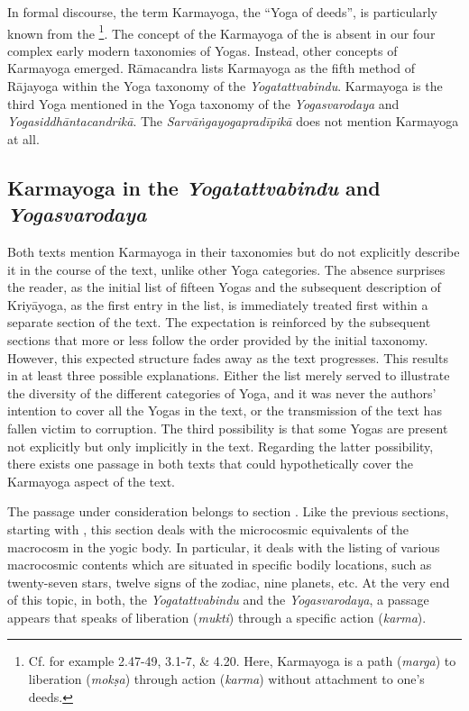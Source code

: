 In formal discourse, the term Karmayoga, the ``Yoga of deeds'', is particularly known from the \footnote{Cf. for example  2.47-49, 3.1-7, \& 4.20. Here, Karmayoga is a path (\textit{marga}) to liberation (\textit{mokṣa}) through action (\textit{karma}) without attachment to one's deeds.}. The concept of the Karmayoga of the  is absent in our four complex early modern taxonomies of Yogas. Instead, other concepts of Karmayoga emerged. Rāmacandra lists Karmayoga as the fifth method of Rājayoga within the Yoga taxonomy of the \textit{Yogatattvabindu}. Karmayoga is the third Yoga mentioned in the Yoga taxonomy of the \textit{Yogasvarodaya} and \textit{Yogasiddhāntacandrikā}. The \textit{Sarvāṅgayogapradīpikā} does not mention Karmayoga at all.  

\subsection{Karmayoga in the \textit{Yogatattvabindu} and \textit{Yogasvarodaya}}

Both texts mention Karmayoga in their taxonomies but do not explicitly describe it in the course of the text, unlike other Yoga categories. The absence surprises the reader, as the initial list of fifteen Yogas and the subsequent description of Kriyāyoga, as the first entry in the list, is immediately treated first within a separate section of the text. The expectation is reinforced by the subsequent sections that more or less follow the order provided by the initial taxonomy. However, this expected structure fades away as the text progresses. This results in at least three possible explanations. Either the list merely served to illustrate the diversity of the different categories of Yoga, and it was never the authors' intention to cover all the Yogas in the text, or the transmission of the text has fallen victim to corruption. The third possibility is that some Yogas are present not explicitly but only implicitly in the text. Regarding the latter possibility, there exists one passage in both texts that could hypothetically cover the Karmayoga aspect of the text.

The passage under consideration belongs to section . Like the previous sections, starting with , this section deals with the microcosmic equivalents of the macrocosm in the yogic body. In particular, it deals with the listing of various macrocosmic contents which are situated in specific bodily locations, such as twenty-seven stars, twelve signs of the zodiac, nine planets, etc. At the very end of this topic, in both, the \textit{Yogatattvabindu} and the \textit{Yogasvarodaya}, a passage appears that speaks of liberation (\textit{mukti}) through a specific action (\textit{karma}).

